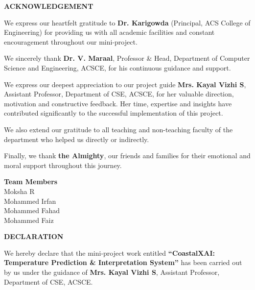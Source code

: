 \documentclass[12pt, a4paper]{article}
\begin{document}
\vspace*{2cm}
\begin{center}
{\Large \textbf{ACKNOWLEDGEMENT}}\\[1.5cm]
\end{center}

\noindent
We express our heartfelt gratitude to \textbf{Dr. Karigowda} (Principal, ACS College of Engineering) for providing us with all academic facilities and constant encouragement throughout our mini-project.

\vspace{0.4cm}
\noindent
We sincerely thank \textbf{Dr. V. Maraal}, Professor \& Head, Department of Computer Science and Engineering, ACSCE, for his continuous guidance and support.

\vspace{0.4cm}
\noindent
We express our deepest appreciation to our project guide \textbf{Mrs. Kayal Vizhi S}, Assistant Professor, Department of CSE, ACSCE, for her valuable direction, motivation and constructive feedback. Her time, expertise and insights have contributed significantly to the successful implementation of this project.

\vspace{0.4cm}
\noindent
We also extend our gratitude to all teaching and non-teaching faculty of the department who helped us directly or indirectly.

\vspace{0.4cm}
\noindent
Finally, we thank \textbf{the Almighty}, our friends and families for their emotional and moral support throughout this journey.

\vspace{1.2cm}
\begin{flushright}
\textbf{Team Members}\\
Moksha R\\
Mohammed Irfan\\
Mohammed Fahad\\
Mohammed Faiz
\end{flushright}
\newpage
\thispagestyle{empty}

\begin{center}
{\Large \textbf{DECLARATION}}\\[1.5cm]
\end{center}

\noindent
We hereby declare that the mini-project work entitled  
\textbf{“CoastalXAI: Temperature Prediction \& Interpretation System”}  
has been carried out by us under the guidance of \textbf{Mrs. Kayal Vizhi S}, Assistant Professor, Department of CSE, ACSCE.
\end{document}
